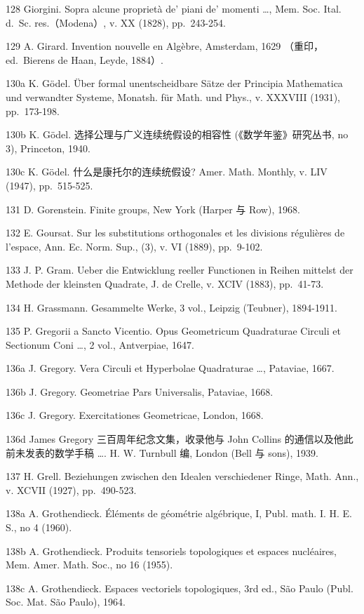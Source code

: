 128 Giorgini. Sopra alcune proprietà de' piani de' momenti \ldots, Mem. Soc. Ital. d.~Sc. res.（Modena）, v. XX (1828), pp.~243-254.

129 A. Girard. Invention nouvelle en Algèbre, Amsterdam, 1629 （重印，ed.~Bierens de Haan, Leyde, 1884）.

130a K. Gödel. Über formal unentscheidbare Sätze der Principia Mathematica und verwandter Systeme, Monatsh. für Math. und Phys., v. XXXVIII (1931), pp.~173-198.

130b K. Gödel. 选择公理与广义连续统假设的相容性 (《数学年鉴》研究丛书, no 3), Princeton, 1940.

130c K. Gödel. 什么是康托尔的连续统假设? Amer. Math. Monthly, v. LIV (1947), pp.~515-525.

131 D. Gorenstein. Finite groups, New York (Harper 与 Row), 1968.

132 E. Goursat. Sur les substitutions orthogonales et les divisions régulières de l'espace, Ann. Ec. Norm. Sup., (3), v. VI (1889), pp.~9-102.

133 J. P. Gram. Ueber die Entwicklung reeller Functionen in Reihen mittelst der Methode der kleinsten Quadrate, J. de Crelle, v. XCIV (1883), pp.~41-73.

134 H. Grassmann. Gesammelte Werke, 3 vol., Leipzig (Teubner), 1894-1911.

135 P. Gregorii a Sancto Vicentio. Opus Geometricum Quadraturae Circuli et Sectionum Coni \ldots, 2 vol., Antverpiae, 1647.

136a J. Gregory. Vera Circuli et Hyperbolae Quadraturae \ldots, Pataviae, 1667.

136b J. Gregory. Geometriae Pars Universalis, Pataviae, 1668.

136c J. Gregory. Exercitationes Geometricae, London, 1668.

136d James Gregory 三百周年纪念文集，收录他与 John Collins 的通信以及他此前未发表的数学手稿 \ldots. H. W. Turnbull 编, London (Bell 与 sons), 1939.

137 H. Grell. Beziehungen zwischen den Idealen verschiedener Ringe, Math. Ann., v. XCVII (1927), pp.~490-523.

138a A. Grothendieck. Éléments de géométrie algébrique, I, Publ. math. I. H. E. S., no 4 (1960).

138b A. Grothendieck. Produits tensoriels topologiques et espaces nucléaires, Mem. Amer. Math. Soc., no 16 (1955).

138c A. Grothendieck. Espaces vectoriels topologiques, 3rd ed., São Paulo (Publ. Soc. Mat. São Paulo), 1964.

